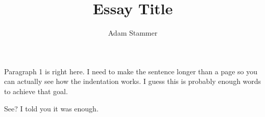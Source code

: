 \documentclass{article}
\begin{document}
\title{Essay Title}
\author{Adam Stammer}
\date{}
\maketitle



Paragraph 1 is right here. I need to make the sentence longer than a page so you can actually see how the indentation works. I guess this is probably enough words to achieve that goal.

See? I told you it was enough.


\end{document}
